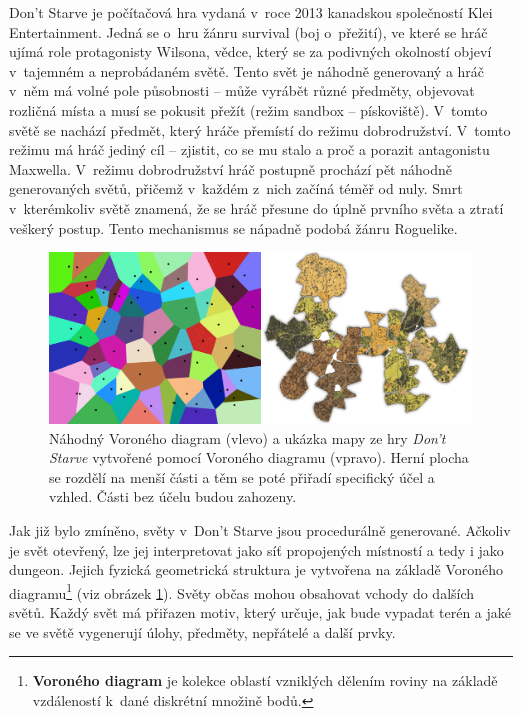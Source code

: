 Don't Starve je počítačová hra vydaná v~roce 2013 kanadskou společností Klei Entertainment.
Jedná se o~hru žánru survival (boj o~přežití), ve které se hráč ujímá role protagonisty Wilsona, vědce, který se za podivných okolností objeví v~tajemném a neprobádaném světě.
Tento svět je náhodně generovaný a hráč v~něm má volné pole působnosti -- může vyrábět různé předměty, objevovat rozličná místa a musí se pokusit přežít (režim sandbox -- pískoviště).
V~tomto světě se nachází předmět, který hráče přemístí do režimu dobrodružství.
V~tomto režimu má hráč jediný cíl -- zjistit, co se mu stalo a proč a porazit antagonistu Maxwella.
V~režimu dobrodružství hráč postupně prochází pět náhodně generovaných světů, přičemž v~každém z~nich začíná téměř od nuly.
Smrt v~kterémkoliv světě znamená, že se hráč přesune do úplně prvního světa a ztratí veškerý postup.
Tento mechanismus  se nápadně podobá žánru Roguelike.
\par
\begin{figure}[hbt]
    \centering
    \includegraphics[width=1.0\textwidth]{obrazky/dont_starve_map.png}
    \caption{Náhodný Voroného diagram (vlevo) a ukázka mapy ze hry \textit{Don't Starve} vytvořené pomocí Voroného diagramu (vpravo). Herní plocha se rozdělí na menší části a těm se poté přiřadí specifický účel a vzhled. Části bez účelu budou zahozeny.}
    \label{img:dont_starve_map}
\end{figure}
Jak již bylo zmíněno, světy v~Don't Starve jsou procedurálně generované.
Ačkoliv je svět otevřený, lze jej interpretovat jako síť propojených místností a tedy i jako dungeon.
Jejich fyzická geometrická struktura je vytvořena na základě Voroného diagramu\footnote{\textbf{Voroného diagram} je kolekce oblastí vzniklých dělením roviny na základě vzdáleností k~dané diskrétní množině bodů.} (viz obrázek \ref{img:dont_starve_map}).
Světy občas mohou obsahovat vchody do dalších světů.
Každý svět má přiřazen motiv, který určuje, jak bude vypadat terén a jaké se ve světě vygenerují úlohy, předměty, nepřátelé a další prvky.
